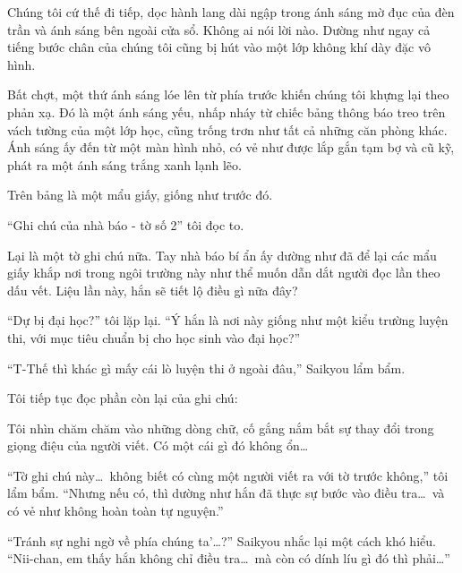 \documentclass[../main.tex]{subfiles}
\begin{document}
\ct

Chúng tôi cứ thế đi tiếp, dọc hành lang dài ngập trong ánh sáng mờ đục của đèn trần và ánh sáng bên ngoài cửa sổ. Không ai nói lời nào. Dường như ngay cả tiếng bước chân của chúng tôi cũng bị hút vào một lớp không khí dày đặc vô hình.

Bất chợt, một thứ ánh sáng lóe lên từ phía trước khiến chúng tôi khựng lại theo phản xạ. Đó là một ánh sáng yếu, nhấp nháy từ chiếc bảng thông báo treo trên vách tường của một lớp học, cũng trống trơn như tất cả những căn phòng khác. Ánh sáng ấy đến từ một màn hình nhỏ, có vẻ như được lắp gắn tạm bợ và cũ kỹ, phát ra một ánh sáng trắng xanh lạnh lẽo.

Trên bảng là một mẩu giấy, giống như trước đó.

``{\vnmsans Ghi chú của nhà báo - tờ số 2}'' tôi đọc to.

Lại là một tờ ghi chú nữa. Tay nhà báo bí ẩn ấy dường như đã để lại các mẩu giấy khắp nơi trong ngôi trường này như thể muốn dẫn dắt người đọc lần theo dấu vết. Liệu lần này, hắn sẽ tiết lộ điều gì nữa đây?


``Dự bị đại học?'' tôi lặp lại. ``Ý hắn là nơi này giống như một kiểu trường luyện thi, với mục tiêu chuẩn bị cho học sinh vào đại học?''

``T-Thế thì khác gì mấy cái lò luyện thi ở ngoài đâu,'' Saikyou lẩm bẩm.

Tôi tiếp tục đọc phần còn lại của ghi chú:


Tôi nhìn chăm chăm vào những dòng chữ, cố gắng nắm bắt sự thay đổi trong giọng điệu của người viết. Có một cái gì đó không ổn\dots

``Tờ ghi chú này\dots\ không biết có cùng một người viết ra với tờ trước không,'' tôi lẩm bẩm. ``Nhưng nếu có, thì dường như hắn đã thực sự bước vào điều tra\dots\ và có vẻ như không hoàn toàn tự nguyện.''

``Tránh sự nghi ngờ về phía chúng ta'\dots?'' Saikyou nhắc lại một cách khó hiểu. ``Nii-chan, em thấy hắn không chỉ điều tra\dots\ mà còn có dính líu gì đó thì phải\dots''
\end{document}
